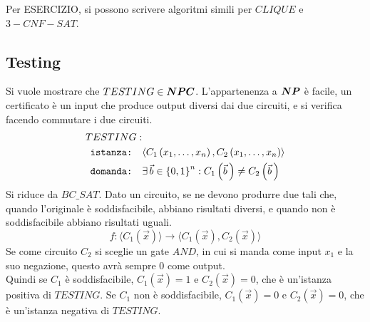 Per ESERCIZIO, si possono scrivere algoritmi simili per $CLIQUE$ e $3-CNF-SAT$.


\subsection{Testing}

Si vuole mostrare che $TESTING \in \bm{NPC}$.
L'appartenenza a $\bm{NP}$ è facile, un certificato è un input che produce output diversi dai due circuiti, e si verifica facendo commutare i due circuiti.
\begin{align*}
    TESTING: & \\
    \texttt{istanza:} \quad & \langle
    C_1 \left( x_1, \ldots, x_n \right),
    C_2 \left( x_1, \ldots, x_n \right)
    \rangle \\
    \texttt{domanda:} \quad & \exists \, \vec{b} \in \left\{0,1\right\}^{n} :
    C_1 \left( \vec{b} \, \right) \ne C_2 \left( \vec{b} \, \right)
\end{align*}
Si riduce da $BC\_SAT$.
Dato un circuito, se ne devono produrre due tali che, quando l'originale è soddisfacibile, abbiano risultati diversi, e quando non è soddisfacibile abbiano risultati uguali.
\begin{equation*}
    f : 
    \langle
    C_1 \left( \vec{x} \right)
    \rangle
    \to
    \langle
    C_1 \left( \vec{x} \right),
    C_2 \left( \vec{x} \right)
    \rangle
\end{equation*}
Se come circuito $C_2$ si sceglie un gate $AND$, in cui si manda come input $x_1$ e la suo negazione, questo avrà sempre 0 come output.
\\
Quindi se $C_1$ è soddisfacibile, 
$ C_1 \left( \vec{x} \right) = 1 $
e 
$ C_2 \left( \vec{x} \right) = 0 $,
che è un'istanza positiva di $TESTING$.
Se $C_1$ non è soddisfacibile, 
$ C_1 \left( \vec{x} \right) = 0 $
e 
$ C_2 \left( \vec{x} \right) = 0 $,
che è un'istanza negativa di $TESTING$.

